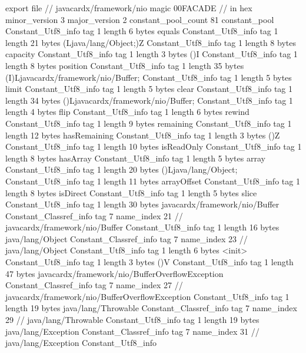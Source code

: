 export file {		// javacardx/framework/nio
	magic	00FACADE		 // in hex
	minor_version	3
	major_version	2
	constant_pool_count	81
	constant_pool {
		Constant_Utf8_info {
			tag	1
			length	6
			bytes	equals
		}
		Constant_Utf8_info {
			tag	1
			length	21
			bytes	(Ljava/lang/Object;)Z
		}
		Constant_Utf8_info {
			tag	1
			length	8
			bytes	capacity
		}
		Constant_Utf8_info {
			tag	1
			length	3
			bytes	()I
		}
		Constant_Utf8_info {
			tag	1
			length	8
			bytes	position
		}
		Constant_Utf8_info {
			tag	1
			length	35
			bytes	(I)Ljavacardx/framework/nio/Buffer;
		}
		Constant_Utf8_info {
			tag	1
			length	5
			bytes	limit
		}
		Constant_Utf8_info {
			tag	1
			length	5
			bytes	clear
		}
		Constant_Utf8_info {
			tag	1
			length	34
			bytes	()Ljavacardx/framework/nio/Buffer;
		}
		Constant_Utf8_info {
			tag	1
			length	4
			bytes	flip
		}
		Constant_Utf8_info {
			tag	1
			length	6
			bytes	rewind
		}
		Constant_Utf8_info {
			tag	1
			length	9
			bytes	remaining
		}
		Constant_Utf8_info {
			tag	1
			length	12
			bytes	hasRemaining
		}
		Constant_Utf8_info {
			tag	1
			length	3
			bytes	()Z
		}
		Constant_Utf8_info {
			tag	1
			length	10
			bytes	isReadOnly
		}
		Constant_Utf8_info {
			tag	1
			length	8
			bytes	hasArray
		}
		Constant_Utf8_info {
			tag	1
			length	5
			bytes	array
		}
		Constant_Utf8_info {
			tag	1
			length	20
			bytes	()Ljava/lang/Object;
		}
		Constant_Utf8_info {
			tag	1
			length	11
			bytes	arrayOffset
		}
		Constant_Utf8_info {
			tag	1
			length	8
			bytes	isDirect
		}
		Constant_Utf8_info {
			tag	1
			length	5
			bytes	slice
		}
		Constant_Utf8_info {
			tag	1
			length	30
			bytes	javacardx/framework/nio/Buffer
		}
		Constant_Classref_info {
			tag	7
			name_index	21		// javacardx/framework/nio/Buffer
		}
		Constant_Utf8_info {
			tag	1
			length	16
			bytes	java/lang/Object
		}
		Constant_Classref_info {
			tag	7
			name_index	23		// java/lang/Object
		}
		Constant_Utf8_info {
			tag	1
			length	6
			bytes	<init>
		}
		Constant_Utf8_info {
			tag	1
			length	3
			bytes	()V
		}
		Constant_Utf8_info {
			tag	1
			length	47
			bytes	javacardx/framework/nio/BufferOverflowException
		}
		Constant_Classref_info {
			tag	7
			name_index	27		// javacardx/framework/nio/BufferOverflowException
		}
		Constant_Utf8_info {
			tag	1
			length	19
			bytes	java/lang/Throwable
		}
		Constant_Classref_info {
			tag	7
			name_index	29		// java/lang/Throwable
		}
		Constant_Utf8_info {
			tag	1
			length	19
			bytes	java/lang/Exception
		}
		Constant_Classref_info {
			tag	7
			name_index	31		// java/lang/Exception
		}
		Constant_Utf8_info {
}}}
